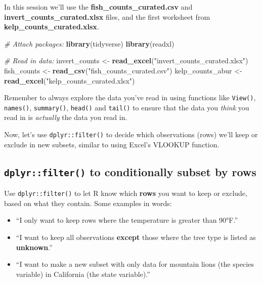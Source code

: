 \documentclass[]{book}
\newenvironment{Shaded}{\begin{snugshade}}{\end{snugshade}}
\newcommand{\CommentTok}[1]{\textcolor[rgb]{0.56,0.35,0.01}{\textit{#1}}}
\newcommand{\KeywordTok}[1]{\textcolor[rgb]{0.13,0.29,0.53}{\textbf{#1}}}
\newcommand{\NormalTok}[1]{#1}
\newcommand{\StringTok}[1]{\textcolor[rgb]{0.31,0.60,0.02}{#1}}
\providecommand{\tightlist}{%
  \setlength{\itemsep}{0pt}\setlength{\parskip}{0pt}}
\begin{document}
In this session we'll use the \textbf{fish\_counts\_curated.csv} and \textbf{invert\_counts\_curated.xlsx} files, and the first worksheet from \textbf{kelp\_counts\_curated.xlsx}.

\begin{Shaded}
\begin{Highlighting}[]
\CommentTok{# Attach packages:}
\KeywordTok{library}\NormalTok{(tidyverse)}
\KeywordTok{library}\NormalTok{(readxl)}

\CommentTok{# Read in data: }
\NormalTok{invert_counts <-}\StringTok{ }\KeywordTok{read_excel}\NormalTok{(}\StringTok{"invert_counts_curated.xlsx"}\NormalTok{)}
\NormalTok{fish_counts <-}\StringTok{ }\KeywordTok{read_csv}\NormalTok{(}\StringTok{"fish_counts_curated.csv"}\NormalTok{)}
\NormalTok{kelp_counts_abur <-}\StringTok{ }\KeywordTok{read_excel}\NormalTok{(}\StringTok{"kelp_counts_curated.xlsx"}\NormalTok{)}
\end{Highlighting}
\end{Shaded}

Remember to always explore the data you've read in using functions like \texttt{View()}, \texttt{names()}, \texttt{summary()}, \texttt{head()} and \texttt{tail()} to ensure that the data you \emph{think} you read in is \emph{actually} the data you read in.

Now, let's use \texttt{dplyr::filter()} to decide which observations (rows) we'll keep or exclude in new subsets, similar to using Excel's VLOOKUP function.

\hypertarget{dplyrfilter-to-conditionally-subset-by-rows}{%
\subsection{\texorpdfstring{\texttt{dplyr::filter()} to conditionally subset by rows}{dplyr::filter() to conditionally subset by rows}}\label{dplyrfilter-to-conditionally-subset-by-rows}}

Use \texttt{dplyr::filter()} to let R know which \textbf{rows} you want to keep or exclude, based on what they contain. Some examples in words:

\begin{itemize}
\tightlist
\item
  ``I only want to keep rows where the temperature is greater than 90°F.''
\item
  ``I want to keep all observations \textbf{except} those where the tree type is listed as \textbf{unknown}.''
\item
  ``I want to make a new subset with only data for mountain lions (the species variable) in California (the state variable).''
\end{itemize}
\end{document}
